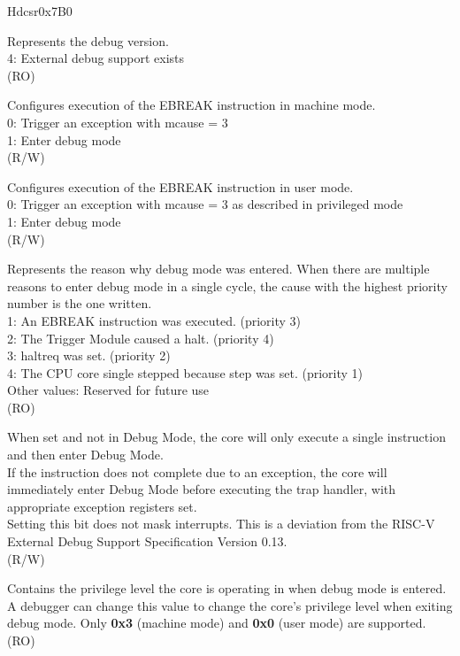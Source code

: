 \begin{register}{H}{dcsr}{0x7B0}\label{regdesc:LPDCSR}
%
%
%
%
%
%
%
%
%
%
\regnewline%
\begin{regdesc}\begin{reglist}
\label{xdebugver}\item [xdebugver] Represents the debug version.\\
4: External debug support exists\\
(RO)
\label{ebreakm}\item [ebreakm] Configures execution of the EBREAK instruction in machine mode.\\
0: Trigger an exception with mcause = 3\\
1: Enter debug mode\\
(R/W)
\label{ebreaku}\item [ebreaku] Configures execution of the EBREAK instruction in user mode.\\
0: Trigger an exception with mcause = 3 as described in privileged mode\\
1: Enter debug mode\\
(R/W)
\label{cause}\item [cause] Represents the reason why debug mode was entered. When there are multiple reasons to enter debug mode in a single cycle, the cause with the highest priority number is the one written.\\
1: An EBREAK instruction was executed. (priority 3)\\
2: The Trigger Module caused a halt. (priority 4)\\
3: haltreq was set. (priority 2)\\
4: The CPU core single stepped because step was set. (priority 1)\\
Other values: Reserved for future use\\
(RO)
\label{step}\item [step] When set and not in Debug Mode, the core will only execute a single instruction and then enter Debug Mode. \\
If the instruction does not complete due to an exception, the core will immediately enter Debug Mode before executing the trap handler, with appropriate exception registers set.\\
Setting this bit does not mask interrupts. This is a deviation from the RISC-V External Debug Support Specification Version 0.13.\\
(R/W)
\label{prv}\item [prv] Contains the privilege level the core is operating in when debug mode is entered. A debugger can change this value to change the core's privilege level when exiting debug mode. Only \textbf{0x3} (machine mode) and \textbf{0x0} (user mode) are supported. (RO)
\end{reglist}\end{regdesc}
\end{register}

